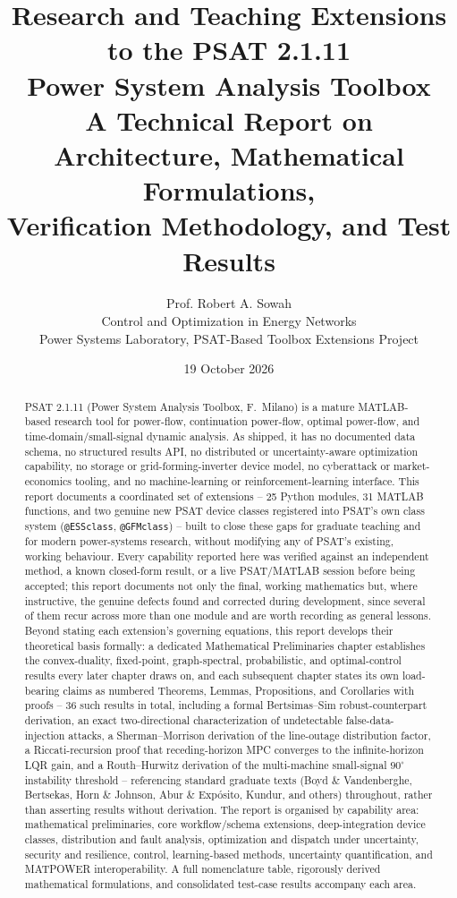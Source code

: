 \documentclass[11pt]{report}
\title{\textbf{Research and Teaching Extensions to the PSAT 2.1.11\\
Power System Analysis Toolbox}\\[0.3em]
\large A Technical Report on Architecture, Mathematical Formulations,\\
Verification Methodology, and Test Results}
\author{Prof. Robert A. Sowah\\
\small Control and Optimization in Energy Networks\\
\small Power Systems Laboratory, PSAT-Based Toolbox Extensions Project}
\date{19 October 2026}
\newcommand{\pkg}[1]{\texttt{#1}}
\theoremstyle{plain}
\theoremstyle{definition}
\theoremstyle{remark}
\begin{document}
\maketitle

\begin{abstract}
\noindent
PSAT 2.1.11 (Power System Analysis Toolbox, F.\ Milano) is a mature
MATLAB-based research tool for power-flow, continuation power-flow,
optimal power-flow, and time-domain/small-signal dynamic analysis. As
shipped, it has no documented data schema, no structured results API, no
distributed or uncertainty-aware optimization capability, no storage or
grid-forming-inverter device model, no cyberattack or market-economics
tooling, and no machine-learning or reinforcement-learning interface.
This report documents a coordinated set of extensions -- 25 Python
modules, 31 MATLAB functions, and two genuine new PSAT device classes
registered into PSAT's own class system (\pkg{@ESSclass},
\pkg{@GFMclass}) -- built to close these gaps for graduate teaching and
for modern power-systems research, without modifying any of PSAT's
existing, working behaviour. Every capability reported here was verified
against an independent method, a known closed-form result, or a live
PSAT/MATLAB session before being accepted; this report documents not
only the final, working mathematics but, where instructive, the genuine
defects found and corrected during development, since several of them
recur across more than one module and are worth recording as general
lessons. Beyond stating each extension's governing equations, this
report develops their theoretical basis formally: a dedicated
Mathematical Preliminaries chapter establishes the convex-duality,
fixed-point, graph-spectral, probabilistic, and optimal-control results
every later chapter draws on, and each subsequent chapter states its
own load-bearing claims as numbered Theorems, Lemmas, Propositions, and
Corollaries with proofs -- 36 such results in total, including a formal
Bertsimas--Sim robust-counterpart derivation, an exact two-directional
characterization of undetectable false-data-injection attacks, a
Sherman--Morrison derivation of the line-outage distribution factor, a
Riccati-recursion proof that receding-horizon MPC converges to the
infinite-horizon LQR gain, and a Routh--Hurwitz derivation of the
multi-machine small-signal $90^\circ$ instability threshold --
referencing standard graduate texts (Boyd \& Vandenberghe, Bertsekas,
Horn \& Johnson, Abur \& Exp\'osito, Kundur, and others) throughout,
rather than asserting results without derivation. The report is
organised by capability area: mathematical preliminaries, core
workflow/schema extensions, deep-integration device classes, distribution
and fault analysis, optimization and dispatch under uncertainty, security
and resilience, control, learning-based methods, uncertainty
quantification, and MATPOWER interoperability. A full nomenclature table,
rigorously derived mathematical formulations, and consolidated
test-case results accompany each area.
\end{abstract}
\end{document}
